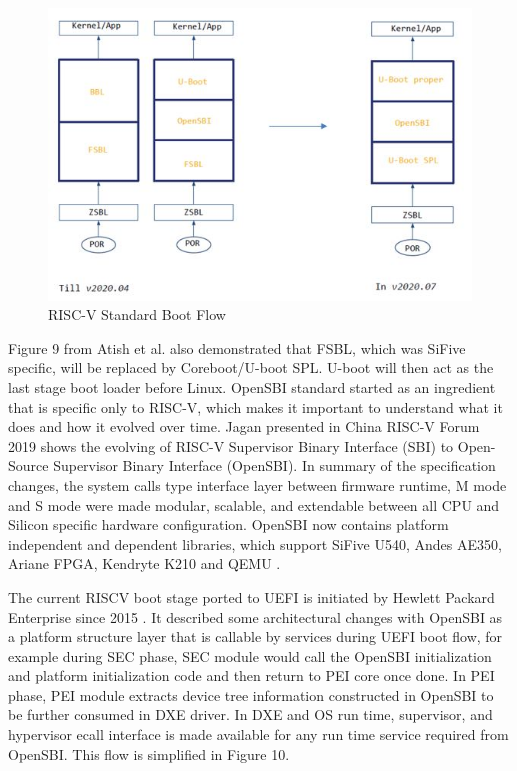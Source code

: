 \documentclass[]{rsos}%
\begin{document}
\begin{figure}[hbt!]
	\centering
	\includegraphics{figs/RiscVStandardBootFlow.JPG}
	\caption{RISC-V Standard Boot Flow \cite{R51:1}}
\end{figure}

Figure 9 from Atish et al. also demonstrated that FSBL, which was SiFive specific, will be replaced by Coreboot/U-boot SPL. U-boot will then act as the last stage boot loader before Linux. OpenSBI standard started as an ingredient that is specific only to RISC-V, which makes it important to understand what it does and how it evolved over time. Jagan presented in China RISC-V Forum 2019 shows the evolving of RISC-V Supervisor Binary Interface (SBI) to Open-Source Supervisor Binary Interface (OpenSBI). In summary of the specification changes, the system calls type interface layer between firmware runtime, M mode and S mode were made modular, scalable, and extendable between all CPU and Silicon specific hardware configuration. OpenSBI now contains platform independent and dependent libraries, which support SiFive U540, Andes AE350, Ariane FPGA, Kendryte K210 and QEMU \cite{R51:1}.

The current RISCV boot stage ported to UEFI is initiated by Hewlett Packard Enterprise since 2015  \cite{R51:2}. It described some architectural changes with OpenSBI as a platform structure layer that is callable by services during UEFI boot flow, for example during SEC phase, SEC module would call the OpenSBI initialization and platform initialization code and then return to PEI core once done. In PEI phase, PEI module extracts device tree information constructed in OpenSBI to be further consumed in DXE driver. In DXE and OS run time, supervisor, and hypervisor ecall interface is made available for any run time service required from OpenSBI. This flow is simplified in Figure 10.
\end{document}
